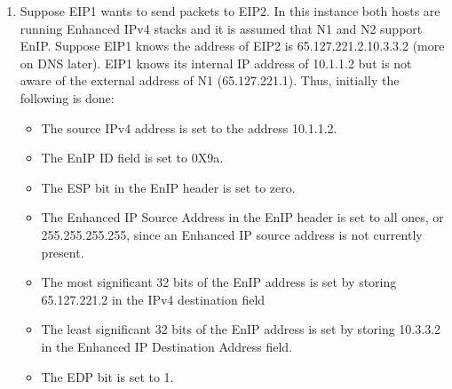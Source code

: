 \begin{enumerate}
\item Suppose EIP1 wants to send packets to EIP2. In this instance both hosts are running Enhanced IPv4 stacks and it is assumed that N1 and N2 support EnIP. Suppose EIP1 knows the address of EIP2 is 65.127.221.2.10.3.3.2 (more on DNS later). EIP1 knows its internal IP address of 10.1.1.2 but is not aware of the external address of N1 (65.127.221.1). Thus, initially the following is done: 
  \begin{itemize}
   \item The source IPv4 address is set to the address 10.1.1.2.
   \item The EnIP ID field is set to 0X9a.
   \item The ESP bit in the EnIP header is set to zero. 
   \item The Enhanced IP Source Address in the EnIP header is set to all ones, or 255.255.255.255, since an Enhanced IP source address is not currently present.
   \item The most significant 32 bits of the EnIP address is set by storing 65.127.221.2 in the IPv4 destination field 
   \item The least significant 32 bits of the EnIP address is set by storing 10.3.3.2 in the Enhanced IP Destination Address field.
   \item The EDP bit is set to 1.
  \end{itemize}


\end{enumerate}
